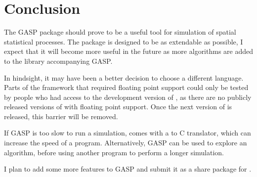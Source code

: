 
\chapter{Conclusion}

The GASP package should prove to be a useful tool for simulation of
spatial statistical processes.  The package is designed to be as
extendable as possible, I expect that it will become more useful in
the future as more algorithms are added to the library accompanying
GASP.

In hindsight, it may have been a better decision to choose a different
language.  Parts of the framework that required floating point support
could only be tested by people who had access to the development
version of \GAP, as there are no publicly released versions of \GAP{}
with floating point support.  Once the next version of \GAP{} is
released, this barrier will be removed.

If GASP is too slow to run a simulation, \GAP{} comes with a \GAP{} to
C translator, which can increase the speed of a program.
Alternatively, GASP can be used to explore an algorithm, before using
another program to perform a longer simulation.

I plan to add some more features to GASP and submit it as a share
package for \GAP.
